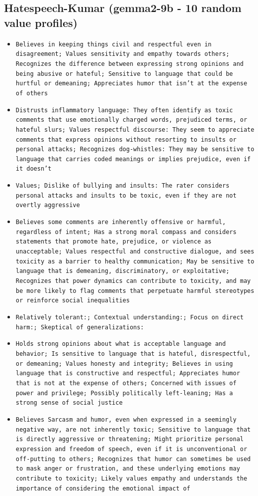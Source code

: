 \documentclass[11pt]{article}
\begin{document}
\subsection{Hatespeech-Kumar (gemma2-9b - 10 random value profiles)}
\begin{itemize}
\item \texttt{Believes in keeping things civil and respectful even in disagreement; Values sensitivity and empathy towards others; Recognizes the difference between expressing strong opinions and being abusive or hateful; Sensitive to language that could be hurtful or demeaning; Appreciates humor that isn't at the expense of others}
\item \texttt{Distrusts inflammatory language: They often identify as toxic comments that use emotionally charged words, prejudiced terms, or hateful slurs; Values respectful discourse: They seem to appreciate comments that express opinions without resorting to insults or personal attacks; Recognizes  dog-whistles:   They may be sensitive to  language that carries coded meanings or  implies prejudice, even if it doesn't}
\item \texttt{Values; Dislike of bullying and insults: The rater considers personal attacks and insults to be toxic, even if they are not overtly aggressive}
\item \texttt{Believes some comments are inherently offensive or harmful, regardless of intent; Has a strong moral compass and considers statements that promote hate, prejudice, or violence as unacceptable; Values respectful and constructive dialogue, and sees toxicity as a barrier to healthy communication; May be sensitive to language that is demeaning, discriminatory, or exploitative; Recognizes that power dynamics can contribute to toxicity, and may be more likely to flag comments that perpetuate harmful stereotypes or reinforce social inequalities}
\item \texttt{Relatively tolerant:; Contextual understanding:; Focus on direct harm:; Skeptical of generalizations:}
\item \texttt{Holds strong opinions about what is acceptable language and behavior; Is sensitive to language that is hateful, disrespectful, or demeaning; Values honesty and integrity; Believes in using language that is constructive and respectful; Appreciates humor that is not at the expense of others; Concerned with issues of power and privilege; Possibly politically left-leaning; Has a strong sense of social justice}
\item \texttt{Believes  Sarcasm and humor, even when expressed in a seemingly negative way, are not inherently toxic; Sensitive to language that is directly aggressive or threatening; Might prioritize personal expression and freedom of speech, even if it is unconventional or off-putting to others; Recognizes that humor can sometimes be used to mask anger or frustration, and these underlying emotions may contribute to toxicity; Likely values empathy and understands the importance of considering the emotional impact of}

\end{itemize}
\end{document}
